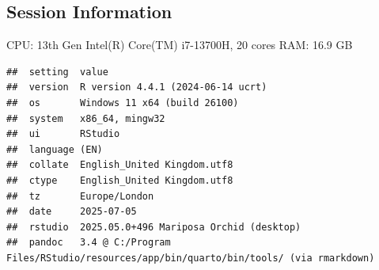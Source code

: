\documentclass[
]{article}
\begin{document}
\subsection{Session Information}\label{Session-Information}

CPU: 13th Gen Intel(R) Core(TM) i7-13700H, 20 cores \newline
RAM: 16.9 GB

\begin{verbatim}
##  setting  value
##  version  R version 4.4.1 (2024-06-14 ucrt)
##  os       Windows 11 x64 (build 26100)
##  system   x86_64, mingw32
##  ui       RStudio
##  language (EN)
##  collate  English_United Kingdom.utf8
##  ctype    English_United Kingdom.utf8
##  tz       Europe/London
##  date     2025-07-05
##  rstudio  2025.05.0+496 Mariposa Orchid (desktop)
##  pandoc   3.4 @ C:/Program Files/RStudio/resources/app/bin/quarto/bin/tools/ (via rmarkdown)
\end{verbatim}
\end{document}
